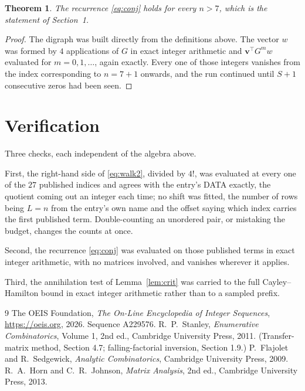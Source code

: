 \documentclass[11pt,a4paper]{article}
\theoremstyle{plain}
\newtheorem{theorem}{Theorem}
\theoremstyle{definition}
\begin{document}
\begin{theorem}
The recurrence \eqref{eq:conj} holds for every $n>7$, which is the statement of
Section~1.
\end{theorem}

\begin{proof}
The digraph was built directly from the definitions above. The vector $w$ was formed by
$4$ applications of $G$ in exact integer arithmetic and $\mathbf{v}^{\!\top}G^{m}w$
evaluated for $m=0,1,\dots$, again exactly. Every one of those integers vanishes from the
index corresponding to $n=7+1$ onwards, and the run continued until $S+1$ consecutive
zeros had been seen.
\end{proof}

\section{Verification}

Three checks, each independent of the algebra above.

First, the right-hand side of \eqref{eq:walk2}, divided by $4!$, was evaluated at every
one of the $27$ published indices and agrees with the entry's DATA exactly, the quotient
coming out an integer each time; no shift was fitted, the number of rows being $L=n$
from the entry's own name and the offset saying which index carries the first published term.
Double-counting an unordered pair, or mistaking the budget, changes the counts at once.

Second, the recurrence \eqref{eq:conj} was evaluated on those published terms in exact
integer arithmetic, with no matrices involved, and vanishes wherever it applies.

Third, the annihilation test of Lemma~\ref{lem:crit} was carried to the full
Cayley--Hamilton bound in exact integer arithmetic rather than to a sampled prefix.

\begin{thebibliography}{9}
 The OEIS Foundation, \emph{The On-Line Encyclopedia of Integer
Sequences}, \url{https://oeis.org}, 2026. Sequence A229576.
 R.~P.~Stanley, \emph{Enumerative Combinatorics}, Volume 1, 2nd ed.,
Cambridge University Press, 2011. (Transfer-matrix method, Section 4.7; falling-factorial
inversion, Section 1.9.)
 P.~Flajolet and R.~Sedgewick, \emph{Analytic Combinatorics}, Cambridge
University Press, 2009.
 R.~A.~Horn and C.~R.~Johnson, \emph{Matrix Analysis}, 2nd ed., Cambridge
University Press, 2013.
\end{thebibliography}
\end{document}
